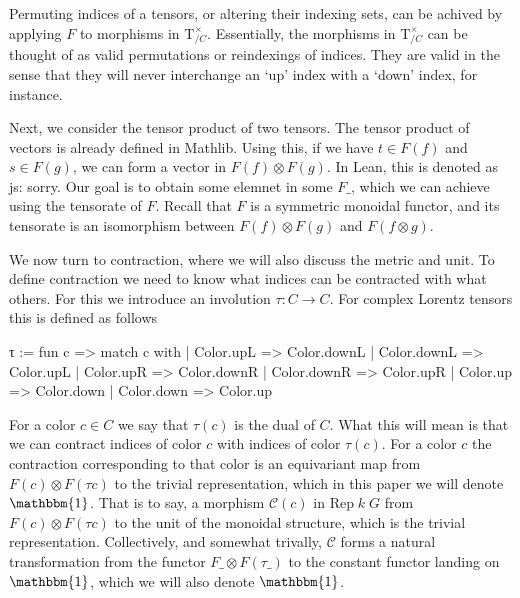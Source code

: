 \documentclass[a4paper, 11pt]{article}
\newcommand{\js}[1]{ {\color{magenta} js:  #1}}
\newcommand{\Rep}[2]{\mathrm{Rep} \; #1 \; #2}
\begin{document}
Permuting indices of a tensors, or altering their indexing sets, can be achived by applying 
$F$ to morphisms in $\mathrm{T}_{/C}^\times$. Essentially, the morphisms in $\mathrm{T}_{/C}^\times$
can be thought of as valid permutations or reindexings of indices. They are valid in the sense that
they will never interchange an `up' index with a `down' index, for instance.

Next, we consider the tensor product of two tensors. The tensor product of vectors is 
already defined in Mathlib. Using this, if we have $t \in F(f)$ and $s \in F(g)$, we can form a vector in $F(f) \otimes F(g)$.
In Lean, this is denoted as \js{sorry}. Our goal is to obtain some elemnet in some $F \_$,
which we can achieve using the tensorate of $F$. Recall that $F$ is a symmetric monoidal functor,
and its tensorate is an isomorphism between $F(f) \otimes F(g)$ and $F(f \otimes g)$.

We now turn to contraction, where we will also discuss the metric and unit. 
To define contraction we need to know what indices can be contracted with what others. 
For this we introduce an involution $\tau : C \to C$. For complex Lorentz tensors
this is defined as follows
\begin{code} 
  τ := fun c =>
    match c with
    | Color.upL => Color.downL
    | Color.downL => Color.upL
    | Color.upR => Color.downR
    | Color.downR => Color.upR
    | Color.up => Color.down
    | Color.down => Color.up
\end{code}
For a color $c \in C$ we say that $\tau(c)$ is the dual of $C$. What this will mean is that 
we can contract indices of color $c$ with indices of color $\tau(c)$.
For a color $c$ the contraction corresponding to that color is an equivariant map from
$F(c) \otimes F(\tau c)$ to the trivial representation, which in this paper we will denote 
$\mathbbm{1}$.  That is to say, a morphism $\mathcal{C}(c)$ in $\Rep{k}{G}$ from $F(c) \otimes F(\tau c)$ to 
the unit of the monoidal structure, which is the trivial representation.
Collectively, and somewhat trivally,  $\mathcal{C}$ forms a natural transformation from the functor 
$F \_ \otimes F (\tau \_)$ to the constant functor landing on $\mathbbm{1}$, which we will also 
denote $\mathbbm{1}$. 
\end{document}
